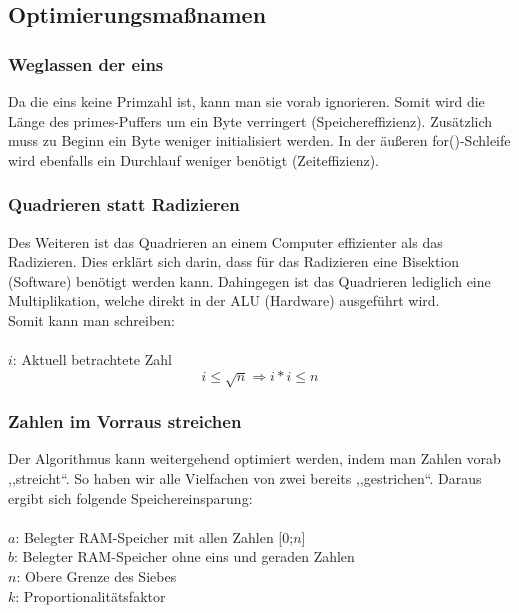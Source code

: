 \documentclass[a4paper,12pt]{article}
\begin{document}
\subsection{Optimierungsmaßnamen}

\subsubsection{Weglassen der eins}
Da die eins keine Primzahl ist, kann man sie vorab ignorieren. Somit wird die Länge des primes-Puffers um ein Byte verringert (Speichereffizienz). Zusätzlich muss zu Beginn ein Byte weniger initialisiert werden. In der äußeren for()-Schleife wird ebenfalls ein Durchlauf weniger benötigt (Zeiteffizienz).\\

\subsubsection{Quadrieren statt Radizieren}
Des Weiteren ist das Quadrieren an einem Computer effizienter als das Radizieren. Dies erklärt sich darin, dass für das Radizieren eine Bisektion (Software) benötigt werden kann. Dahingegen ist das Quadrieren lediglich eine Multiplikation, welche direkt in der ALU (Hardware) ausgeführt wird.\\
Somit kann man schreiben:\\\\
$i$: Aktuell betrachtete Zahl\\
\[ i \leq \sqrt{n} \Rightarrow i * i \leq n \]

\subsubsection{Zahlen im Vorraus streichen}
Der Algorithmus kann weitergehend optimiert werden, indem man Zahlen vorab ,,streicht“. So haben wir alle Vielfachen von zwei bereits ,,gestrichen“. Daraus ergibt sich folgende Speichereinsparung:\\
\\
$a$: Belegter RAM-Speicher mit allen Zahlen [0;$n$]\\
$b$: Belegter RAM-Speicher ohne eins und geraden Zahlen\\
$n$: Obere Grenze des Siebes\\
$k$: Proportionalitätsfaktor\\
\end{document}

